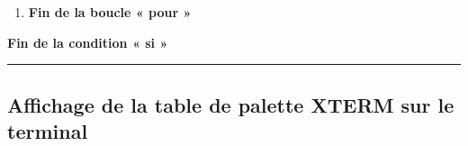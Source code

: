 \documentclass[a4paper,10pt]{article}
\begin{document}
\begin{justify}
\begin{enumerate}
\begin{enumerate}
\begin{itemize}
                    \item \textbf{m}: Il s'agit du code de fin de la séquence de contrôle ANSI.
                \end{itemize}

                \setlength{\parskip}{1em}

                \item La mise en forme du texte est supprimée par le biais de la commande \textbf{\color{cmds}printf} \verb|'\e[0m'|

                \item
                {
                    \textbf{\color{cond}Si} l'indice de couleur actuel n'est pas le sixième de la rangée actuelle, \textbf{\color{cond}alors} un espace est affiché pour préparer la prochaine itération de la boucle \textbf{\color{loop}for}, par le biais de la commande \textbf{\color{cmds}printf} \verb|'\n'|.

                    \textbf{\color{cond}Sinon}, un saut de ligne est effectué par le biais de la commande \textbf{\color{cmds}printf ' '} pour préparer une nouvelle rangée de six colonnes.
                }

                \item \textbf{\color{cond}Fin de la condition « si »}
            \end{enumerate}

    	\item \textbf{\color{loop}Fin de la boucle « pour »}

    	\end{enumerate}

    	\item \textbf{\color{cond}Fin de la condition « si »}

    \end{justify}




    \newpage

    \color{sec2}\par\noindent\rule{\textwidth}{0.4pt}\color{text}

    \color{sec2}
    \subsection{Affichage de la table de palette XTERM sur le terminal}\color{text}
\end{document}
